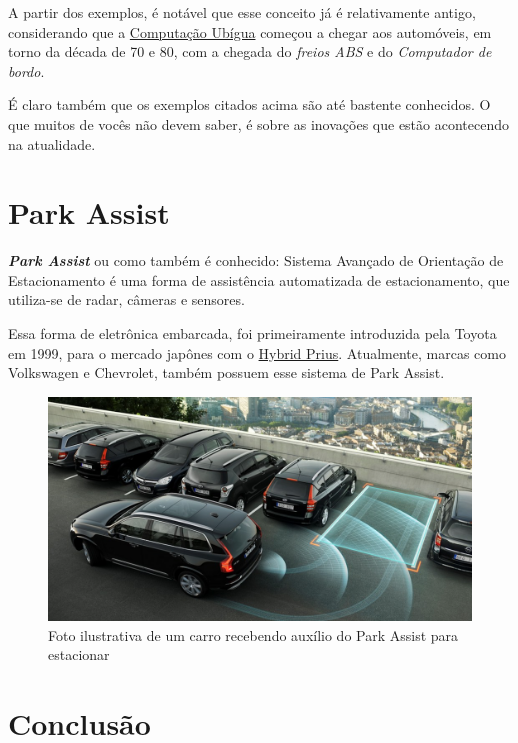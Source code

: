 \documentclass[12pt]{article}
\begin{document}
    A partir dos exemplos, é notável que esse conceito já é relativamente antigo, considerando
    que a \href{https://canaltech.com.br/produtos/O-que-e-Computacao-Ubiqua/}{Computação Ubígua} 
    começou a chegar aos automóveis, em torno da década de 70 e 80, com a chegada
    do \emph{freios ABS} e do \emph{Computador de bordo}.

    É claro também que os exemplos citados acima são até bastente conhecidos. O que muitos de vocês
    não devem saber, é sobre as inovações que estão acontecendo na atualidade.

    \section{Park Assist}

    \textbf{\emph{Park Assist}} ou como também é conhecido: Sistema Avançado de Orientação de Estacionamento 
    é uma forma de assistência automatizada de estacionamento, que utiliza-se de radar, câmeras e sensores.
    
    Essa forma de eletrônica embarcada, foi primeiramente introduzida pela Toyota em 1999, para o mercado 
    japônes com o \href{https://en.wikipedia.org/wiki/Toyota_Prius}{Hybrid Prius}. Atualmente, 
    marcas como Volkswagen e Chevrolet, também possuem esse sistema de Park Assist.

    \begin{figure}[htp]

        \centering
        \includegraphics[scale=0.2]{ParkAssist.png}
        \caption{\centering Foto ilustrativa de um carro recebendo auxílio do Park Assist para estacionar}

    \end{figure}

    \newpage 
    
    \section{Conclusão}
\end{document}
